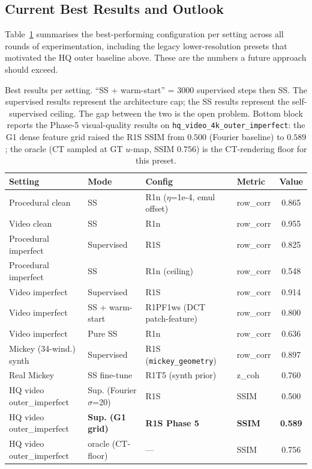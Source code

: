 \documentclass[11pt,a4paper]{article}
\begin{document}
\subsection{Current Best Results and Outlook}
\label{sec:best_results}

Table~\ref{tab:best_results} summarises the best-performing configuration per setting across all rounds of experimentation, including the legacy lower-resolution presets that motivated the HQ outer baseline above. These are the numbers a future approach should exceed.

\begin{table}[H]
\centering
\begin{tabular}{llllc}
\toprule
Setting & Mode & Config & Metric & Value \\
\midrule
Procedural clean & SS & R1n ($\eta$=1e-4, emul offset) & row\_corr & 0.865 \\
Video clean & SS & R1n & row\_corr & 0.955 \\
Procedural imperfect & Supervised & R1S & row\_corr & 0.825 \\
Procedural imperfect & SS & R1n (ceiling) & row\_corr & 0.548 \\
Video imperfect & Supervised & R1S & row\_corr & 0.914 \\
Video imperfect & SS + warm-start & R1PF1ws (DCT patch-feature) & row\_corr & 0.800 \\
Video imperfect & Pure SS & R1n & row\_corr & 0.636 \\
Mickey (34-wind.) synth & Supervised & R1S (\texttt{mickey\_geometry}) & row\_corr & 0.897 \\
Real Mickey & SS fine-tune & R1T5 (synth prior) & z\_coh & 0.760 \\
\midrule
HQ video outer\_imperfect & Sup. (Fourier $\sigma$=20) & R1S & SSIM     & 0.500 \\
HQ video outer\_imperfect & \textbf{Sup. (G1 grid)}    & \textbf{R1S Phase 5} & \textbf{SSIM} & \textbf{0.589} \\
HQ video outer\_imperfect & oracle (CT-floor)          & ---  & SSIM     & 0.756 \\
\bottomrule
\end{tabular}
\caption{Best results per setting. ``SS + warm-start'' = 3000 supervised steps then SS. The supervised results represent the architecture cap; the SS results represent the self-supervised ceiling. The gap between the two is the open problem. Bottom block reports the Phase-5 visual-quality results on \texttt{hq\_video\_4k\_outer\_imperfect}: the G1 dense feature grid raised the R1S SSIM from $0.500$ (Fourier baseline) to $0.589$; the oracle (CT sampled at GT $u$-map, SSIM $0.756$) is the CT-rendering floor for this preset.}
\label{tab:best_results}
\end{table}
\end{document}
